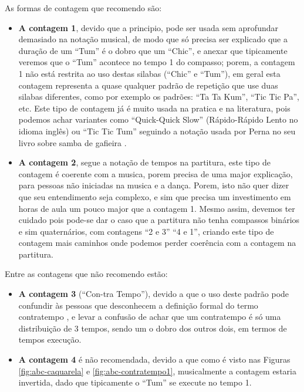 As formas de contagem que recomendo são:
\begin{itemize}
\item \textbf{A contagem 1}, 
devido que a principio, pode ser usada sem aprofundar demasiado 
na notação musical, de modo que só precisa ser explicado que a duração de um 
``Tum'' é o dobro que um ``Chic'', e anexar que tipicamente veremos que o ``Tum''
acontece no tempo 1 do compasso; 
porem, a contagem 1 não está restrita ao uso destas silabas (``Chic'' e ``Tum''), 
em geral esta contagem representa a quase qualquer padrão de repetição
que use duas silabas diferentes, como por exemplo os padrões: ``Ta Ta Kum'', ``Tic Tic Pa'', etc. 
Este tipo de contagem já é muito usada na pratica e na literatura, pois 
podemos achar variantes como ``Quick-Quick Slow'' (Rápido-Rápido Lento no idioma inglês)
ou ``Tic Tic Tum'' seguindo a notação usada por Perna no seu livro sobre samba de gafieira \cite[pp. 146]{perna2002samba}.
\item \textbf{A contagem 2}, segue a notação de tempos na partitura, este tipo de
contagem é coerente com a musica, porem precisa de uma major explicação, 
para pessoas não iniciadas na musica e a dança. Porem, isto não quer dizer que seu
entendimento seja complexo, e sim que precisa um investimento em horas de aula
um pouco major que a contagem 1.
Mesmo assim, devemos ter cuidado pois pode-se dar o caso que a partitura não tenha compassos binários 
e sim quaternários, com contagens ``2 e 3'' ``4 e 1'', 
criando este tipo de contagem mais caminhos onde podemos perder coerência com a contagem na partitura.\\
\end{itemize}


Entre as contagens que não recomendo estão:
\begin{itemize}
\item \textbf{A contagem 3} (``Con-tra Tempo''), 
devido a que o uso deste padrão pode confundir às pessoas que desconhecem 
a definição formal do termo contratempo \cite[pp. 16]{mascarenhascurso} \cite[pp. 36]{azevedocompor}, 
e levar a confusão de achar que um contratempo é só uma distribuição de 3 tempos, 
sendo um o dobro dos outros dois, em termos de tempos execução.
\item \textbf{A contagem 4} é não recomendada, devido a que como é visto nas Figuras 
\ref{fig:abc-caquarela} e \ref{fig:abc-contratempo1}, musicalmente a contagem estaria invertida,
dado que tipicamente o ``Tum'' se execute no tempo 1.\\
\end{itemize}

